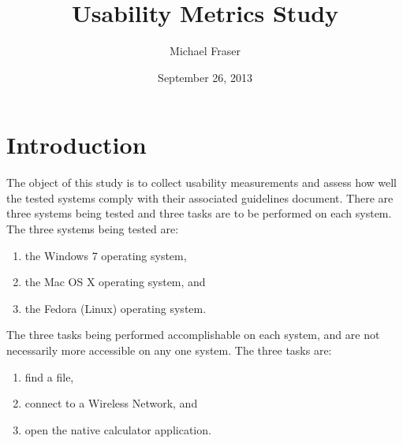 \documentclass[11pt,a4paper]{report}
\begin{document}
\title{Usability Metrics Study}
\author{Michael Fraser}
\date{September 26, 2013}
\maketitle

\section{Introduction}

The object of this study is to collect usability measurements and assess how well the tested systems comply with their associated guidelines document. There are three systems being tested and three tasks are to be performed on each system. The three systems being tested are:
\begin{enumerate}
\item the Windows 7 operating system, 
\item the Mac OS X operating system, and
\item the Fedora (Linux) operating system. 
\end{enumerate}

The three tasks being performed accomplishable on each system, and are not necessarily more accessible on any one system. The three tasks are:
\begin{enumerate}
\item find a file,
\item connect to a Wireless Network, and
\item open the native calculator application.
\end{enumerate}
\end{document}
